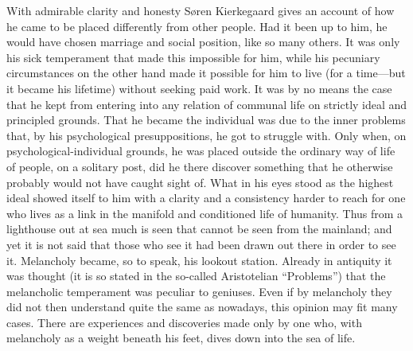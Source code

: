 \documentclass[12pt,a4paper]{book}
\newcommand{\opage}[1]{\marginnote{\footnotesize\textit{[#1]}}}
\begin{document}
With admirable clarity and honesty Søren Kierkegaard gives an account of
how he came to be placed differently from other people. Had it been up to
him, he would have chosen marriage and social position, like so many
others. It was only his sick temperament that made this impossible for
him, while his pecuniary circumstances on the other hand made it possible
for him to live (for a time---but it became his lifetime) without seeking
paid work. It was by no means the case that he kept from entering into
any relation of communal life on strictly ideal and principled grounds.
That he became the individual was due to the inner problems that, by his
psychological presuppositions, he got to struggle with. Only when, on
psychological-individual grounds, he was placed outside the ordinary way
of life of people, on a solitary post, did he there discover something
that he otherwise probably would not have caught sight of. What in his
eyes stood as the highest ideal showed itself to him with a clarity and a
consistency harder to reach for one who lives as a link in the manifold
and conditioned life of humanity. Thus from a lighthouse out at sea much
is seen that cannot be seen from the mainland; and yet it is not said
that those who see it had been drawn out there in order to see it.
Melancholy became, so to speak, his lookout station. Already in antiquity
it was thought (it is so stated in the so-called Aristotelian
``Problems'') that the melancholic
\opage{40}temperament was peculiar to geniuses. Even if by melancholy they
did not then understand quite the same as nowadays, this opinion may fit
many cases. There are experiences and discoveries made only by one who,
with melancholy as a weight beneath his feet, dives down into the sea of
life.
\end{document}
